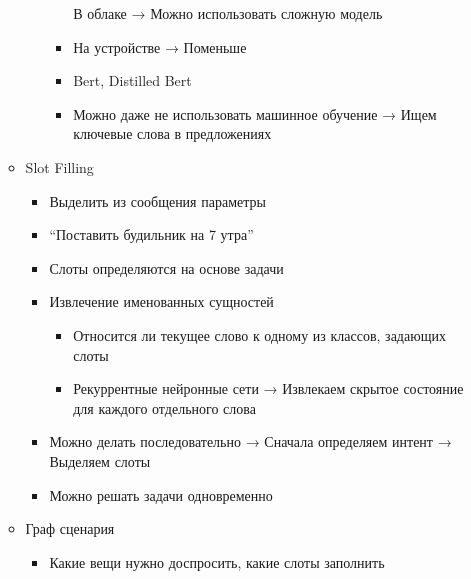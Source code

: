 \documentclass[a4paper, 12pt]{article}
\begin{document}
\begin{itemize}
\begin{itemize}
\begin{itemize}
\begin{itemize}
        В облаке → Можно использовать сложную модель
        
      \item
        
        На устройстве → Поменьше
        
      \item
        
        Bert, Distilled Bert
        
      \item
        
        Можно даже не использовать машинное обучение → Ищем ключевые
        слова в предложениях
        
      \end{itemize}
    \end{itemize}
  \item
    
    Slot Filling
    

    \begin{itemize}
    \item
      
      Выделить из сообщения параметры
      
    \item
      
      ``Поставить будильник на {7 утра}''
      
    \item
      
      Слоты определяются на основе задачи
      

      \item Извлечение именованных сущностей
        

        \begin{itemize}
        \item Относится ли текущее слово к одному из классов, задающих слоты
        \item Рекуррентные нейронные сети → Извлекаем скрытое состояние
            для каждого отдельного слова
            
        \end{itemize}
      \item Можно делать последовательно → Сначала определяем интент →
        Выделяем слоты
        
      \item Можно решать задачи одновременно
    \end{itemize}
  \item
    
    {Граф сценария}
    

    \begin{itemize}
    \item
      
      Какие вещи нужно доспросить, какие слоты заполнить
      
    \end{itemize}
  \end{itemize}
\end{itemize}
\end{document}
